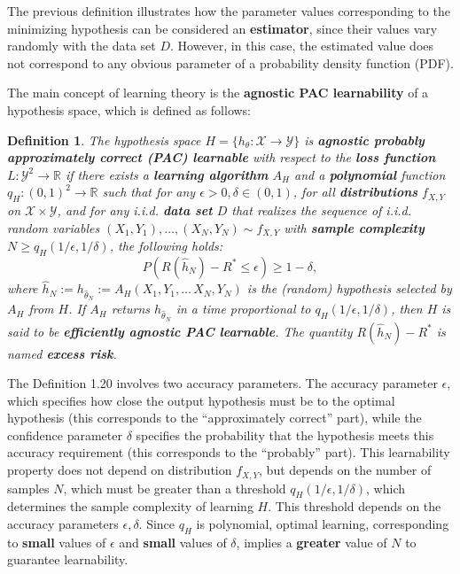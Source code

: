 \documentclass{report}
\newtheorem{definition}{Definition}[chapter]
\begin{document}
The previous definition illustrates how the parameter values corresponding to the minimizing hypothesis can be considered an \textbf{estimator}, since their values vary randomly with the data set $D$. However, in this case, the estimated value does not correspond to any obvious parameter of a probability density function (PDF).

The main concept of learning theory is the \textbf{agnostic PAC learnability} of a hypothesis space, which is defined as follows:

\begin{definition}
The hypothesis space $H = \{h_\theta : \mathcal{X} \to \mathcal{Y}\}$ is \textbf{agnostic probably approximately correct (PAC) learnable} with respect to the \textbf{loss function} $L : \mathcal{Y}^2 \to \mathbb{R}$ if there exists a \textbf{learning algorithm} $A_H$ and a \textbf{polynomial} function $q_H : (0,1) ^2 \to \mathbb{R}$ such that for any $\epsilon > 0,\delta \in (0,1)$, for all \textbf{distributions} $f_{X,Y}$ on $\mathcal{X} \times \mathcal{Y}$, and for any i.i.d. \textbf{data set} $D$ that realizes the sequence of i.i.d. random variables $(X_1, Y_1),\dots,(X_N, Y_N)\sim f_{X,Y}$ with \textbf{sample complexity} $N\geq q_H(1/\epsilon,1/\delta)$, the following holds:
\begin{equation}
P(R(\hat{h}_N) - R^* \leq \epsilon) \geq 1- \delta,
\end{equation}
where $\hat{h}_N := h_{\hat{\theta}_N} := A_H(X_1, Y_1,\dots\,X_N, Y_N)$ is the (random) hypothesis selected by $A_H$ from $H$. If $A_H$ returns $h_{\hat{\theta}_N}$ in a time proportional to $q_H(1/\epsilon,1/\delta)$, then $H$ is said to be \textbf{efficiently agnostic PAC
learnable}. The quantity $R(\hat{h}_N) - R^*$ is named \textbf{excess risk}.
\end{definition}

The Definition 1.20 involves two accuracy parameters. The accuracy parameter $\epsilon$, which specifies how close the output hypothesis must be to the optimal hypothesis (this corresponds to the “approximately correct” part), while the confidence parameter $\delta$ specifies the probability that the hypothesis meets this accuracy requirement (this corresponds to the “probably” part). This learnability property does not depend on distribution $f_{X,Y}$, but depends on the number of samples $N$, which must be greater than a threshold $q_H(1/\epsilon,1/\delta)$, which determines the sample complexity of learning $H$. This threshold depends on the accuracy parameters $\epsilon,\delta$. Since $q_H$ is polynomial, optimal learning, corresponding to \textbf{small} values of $\epsilon$ and \textbf{small} values of $\delta$, implies a \textbf{greater} value of $N$ to guarantee learnability.
\end{document}
